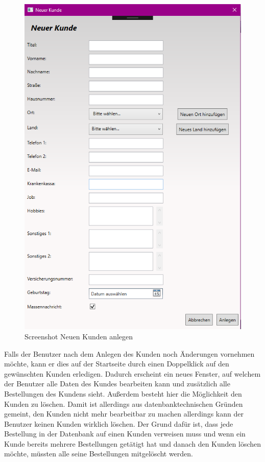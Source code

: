 \begin{figure}[H]
\begin{center}
	\includegraphics[scale=.25]{images/NeuerKunde.png}
\end{center}
	\caption{Screenshot Neuen Kunden anlegen}
	\label{fig:sample}
\end{figure}
Falls der Benutzer nach dem Anlegen des Kunden noch Änderungen vornehmen möchte, kann er dies auf der Startseite durch einen Doppelklick auf den gewünschten Kunden erledigen. Dadurch erscheint ein neues Fenster, auf welchem der Benutzer alle Daten des Kundes bearbeiten kann und zusätzlich alle Bestellungen des Kundens sieht. Außerdem besteht hier die Möglichkeit den Kunden zu löschen. Damit ist allerdings aus datenbanktechnischen Gründen gemeint, den Kunden nicht mehr bearbeitbar zu machen allerdings kann der Benutzer keinen Kunden wirklich löschen. Der Grund dafür ist, dass jede Bestellung in der Datenbank auf einen Kunden verweisen muss und wenn ein Kunde bereits mehrere Bestellungen getätigt hat und danach den Kunden löschen möchte, müssten alle seine Bestellungen mitgelöscht werden. 
